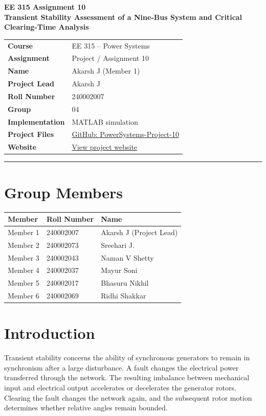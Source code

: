 \documentclass[11pt,a4paper]{article}
\begin{document}
\begin{center}\large\textbf{EE 315 Assignment 10}\\[5pt]\Large\textbf{Transient Stability Assessment of a Nine-Bus System and Critical Clearing-Time Analysis}\end{center}
\begin{tabular}{ll}
\textbf{Course}&EE 315 -- Power Systems\\
\textbf{Assignment}&Project / Assignment 10\\
\textbf{Name}&Akarsh J (Member 1)\\
\textbf{Project Lead}&Akarsh J\\
\textbf{Roll Number}&240002007\\
\textbf{Group}&04\\
\textbf{Implementation}&MATLAB simulation\\
\textbf{Project Files}&\href{https://github.com/pacificblaster1708/PowerSystems-Project-10}{GitHub: PowerSystems-Project-10}\\
\textbf{Website}&\href{https://pacificblaster1708.github.io/PowerSystems-Project-10/}{View project website}
\end{tabular}
\vspace{10pt}\hrule
\section{Group Members}
\begin{center}\begin{tabular}{lll}\toprule Member&Roll Number&Name\\\midrule
Member 1&240002007&Akarsh J (Project Lead)\\
Member 2&240002073&Sreehari J.\\
Member 3&240002043&Naman V Shetty\\
Member 4&240002037&Mayur Soni\\
Member 5&240002017&Bhasuru Nikhil\\
Member 6&240002069&Ridhi Shakkar\\\bottomrule\end{tabular}\end{center}
\section{Introduction}
Transient stability concerns the ability of synchronous generators to remain in synchronism after a large disturbance. A fault changes the electrical power transferred through the network. The resulting imbalance between mechanical input and electrical output accelerates or decelerates the generator rotors. Clearing the fault changes the network again, and the subsequent rotor motion determines whether relative angles remain bounded.
\end{document}
